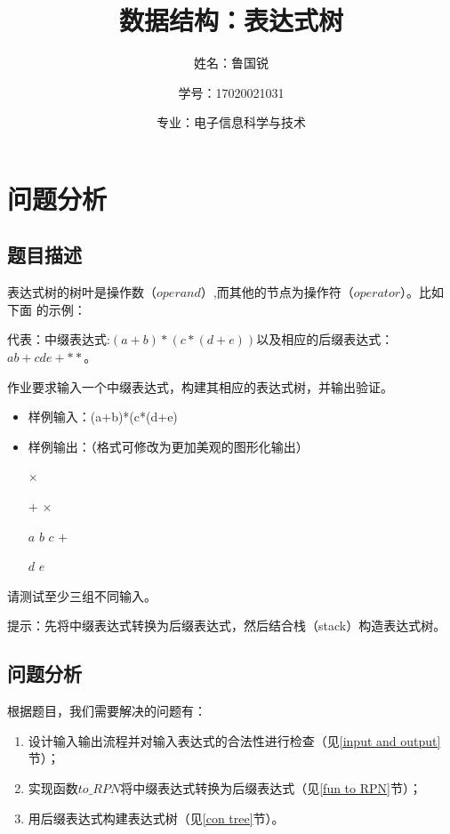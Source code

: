 \documentclass[UTF8]{ctexart}
\title{数据结构：表达式树}
\author{姓名：鲁国锐 \protect\newline
\and 学号：17020021031 \\
\and 专业：电子信息科学与技术}
\begin{document}
	\maketitle
	\renewcommand{\contentsname}{Contents}
	\tableofcontents
	\newpage
	
	\hypersetup{
	bookmarks=true,
	colorlinks=true,
	linkcolor=red,
	urlcolor=blue
	}
	\section{问题分析}
	\subsection{题目描述}
	\indent 表达式树的树叶是操作数（$operand$）,而其他的节点为操作符（$operator$）。比如下面 的示例：
	
	代表：中缀表达式:$(a+b)*(c*(d+e))$以及相应的后缀表达式：$ab+cde+**$。
	
	作业要求输入一个中缀表达式，构建其相应的表达式树，并输出验证。
	\begin{itemize}
		\item 样例输入：(a+b)*(c*(d+e)
		
		\item 样例输出：（格式可修改为更加美观的图形化输出）

				$\times$
			
			$+$                   $\times$
			
			$a$      $b$      $c$      $+$
			
			$d$     $e$
	
	\end{itemize}
	
	
	请测试至少三组不同输入。
	
	提示：先将中缀表达式转换为后缀表达式，然后结合栈（stack）构造表达式树。
	
	

	\subsection{问题分析}
	\indent 根据题目，我们需要解决的问题有：
	\begin{enumerate}[leftmargin=50pt]
	\item 设计输入输出流程并对输入表达式的合法性进行检查（见\ref{input and output}节）；
	\item 实现函数$to\_RPN$将中缀表达式转换为后缀表达式（见\ref{fun to RPN}节）；
	\item 用后缀表达式构建表达式树（见\ref{con tree}节）。
	\end{enumerate}
	
\end{document}

